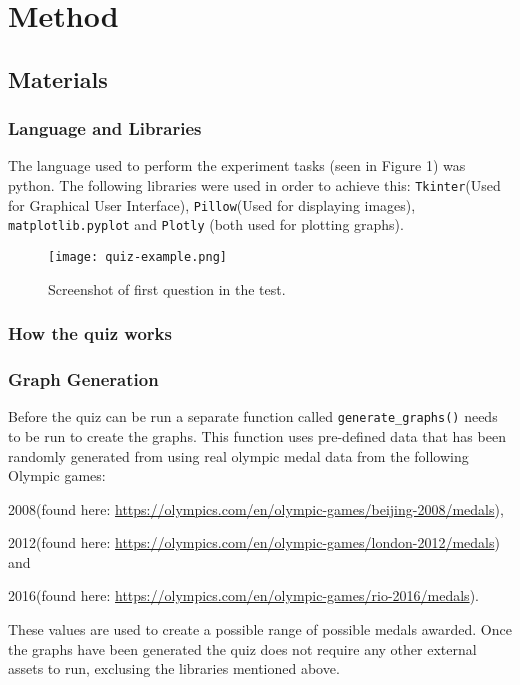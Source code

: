 \section{Method}


\subsection{Materials}
\subsubsection{Language and Libraries}
\quad The language used to perform the experiment tasks (seen in Figure 1) was python. The following libraries were used in order to achieve this:
\verb|Tkinter|(Used for Graphical User Interface), \verb|Pillow|(Used for displaying images), \verb|matplotlib.pyplot| and \verb|Plotly| (both used for plotting graphs).

\begin{figure}[H]
    \centering
    \texttt{[image: quiz-example.png]}
    \caption{Screenshot of first question in the test.}
\end{figure}

\subsubsection{How the quiz works}
\subsubsection*{Graph Generation}
\begin{flushleft}
    \quad Before the quiz can be run a separate function called \verb|generate_graphs()| needs to be run to create the graphs.
    This function uses pre-defined data that has been randomly generated from using real olympic medal data from the following Olympic games:

    2008(found here: \url{https://olympics.com/en/olympic-games/beijing-2008/medals}), 
    
    2012(found here: \url{https://olympics.com/en/olympic-games/london-2012/medals}) and 
    
    2016(found here: \url{https://olympics.com/en/olympic-games/rio-2016/medals}). 
    
    These values are used to create a possible range of possible medals awarded.
    Once the graphs have been generated the quiz does not require any other external assets to run, exclusing the libraries mentioned above.
\end{flushleft}
    
